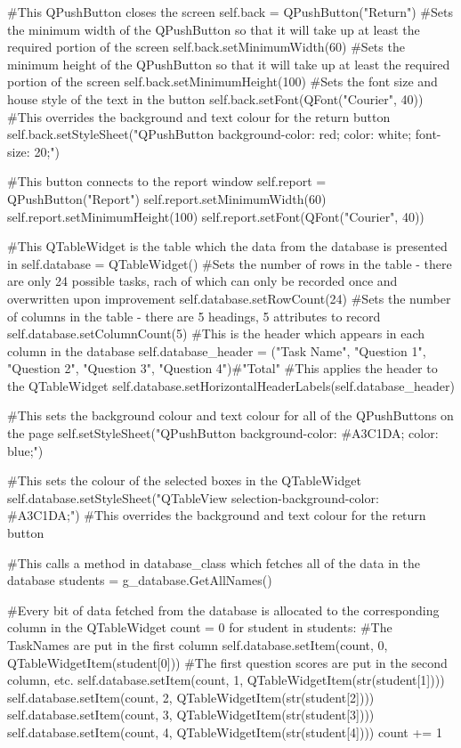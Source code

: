 \begin{landscape}
\begin{python}
        #This QPushButton closes the screen
        self.back = QPushButton("Return")
        #Sets the minimum width of the QPushButton so that it will take up at least the required portion of the screen
        self.back.setMinimumWidth(60)
        #Sets the minimum height of the QPushButton so that it will take up at least the required portion of the screen
        self.back.setMinimumHeight(100)
        #Sets the font size and house style of the text in the button
        self.back.setFont(QFont("Courier", 40))
        #This overrides the background and text colour for the return button
        self.back.setStyleSheet("QPushButton {background-color: red; color: white; font-size: 20;}")

        #This button connects to the report window
        self.report = QPushButton("Report")
        self.report.setMinimumWidth(60)
        self.report.setMinimumHeight(100)
        self.report.setFont(QFont("Courier", 40))
        
        #This QTableWidget is the table which the data from the database is presented in
        self.database = QTableWidget()
        #Sets the number of rows in the table - there are only 24 possible tasks, rach of which can only be recorded once and overwritten upon improvement
        self.database.setRowCount(24)
        #Sets the number of columns in the table - there are 5 headings, 5 attributes to record
        self.database.setColumnCount(5)
        #This is the header which appears in each column in the database
        self.database_header = ("Task Name", "Question 1", "Question 2", "Question 3", "Question 4")#"Total"
        #This applies the header to the QTableWidget
        self.database.setHorizontalHeaderLabels(self.database_header)

        #This sets the background colour and text colour for all of the QPushButtons on the page
        self.setStyleSheet("QPushButton {background-color: #A3C1DA; color: blue;}")

        #This sets the colour of the selected boxes in the QTableWidget
        self.database.setStyleSheet("QTableView {selection-background-color: #A3C1DA;}")
        #This overrides the background and text colour for the return button

        #This calls a method in database_class which fetches all of the data in the database
        students = g_database.GetAllNames()
        
        #Every bit of data fetched from the database is allocated to the corresponding column in the QTableWidget
        count = 0
        for student in students:
            #The TaskNames are put in the first column
            self.database.setItem(count, 0, QTableWidgetItem(student[0]))
            #The first question scores are put in the second column, etc.
            self.database.setItem(count, 1, QTableWidgetItem(str(student[1])))
            self.database.setItem(count, 2, QTableWidgetItem(str(student[2])))
            self.database.setItem(count, 3, QTableWidgetItem(str(student[3])))
            self.database.setItem(count, 4, QTableWidgetItem(str(student[4])))
            count += 1


\end{python}
\end{landscape}
